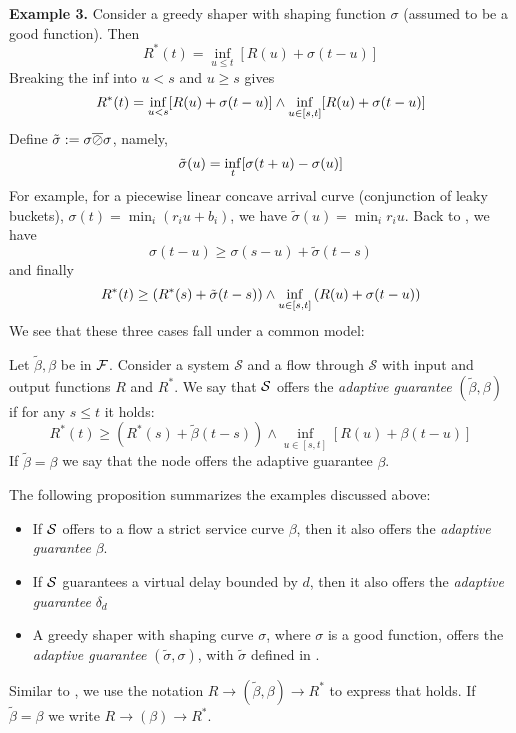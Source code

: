 \textbf{Example 3.} Consider a greedy shaper with shaping
function $\sigma$ (assumed to be a good function). Then
$$
R^*(t) = \inf_{u\leq t} [R(u) + \sigma(t-u)]
$$
Breaking the inf into $u <s$ and $u\geq s$ gives
\begin{equation}\mylabel{eq-ascsh1}
  R^*(t) = \inf_{u < s}[R(u)+\sigma(t-u)] \wedge \inf_{u \in
[s,t]}[R(u)+\sigma(t-u)]
\end{equation}
Define $\tilde{\sigma}:=\sigma \overline{\oslash} \sigma$, namely,
\begin{equation}\mylabel{eq-ascsigtil}
\tilde{\sigma}(u) = \inf_t [\sigma(t+u) - \sigma(u)]
\end{equation}
For example, for a piecewise linear concave arrival curve
(conjunction of leaky buckets), $\sigma(t)=\min_i (r_i u +
b_i)$, we have $\tilde{\sigma}(u)=\min_i r_i u$. Back to
, we have
$$
\sigma(t-u) \geq \sigma(s-u) + \tilde{\sigma}(t-s)
$$
and finally
\begin{equation}\mylabel{eq-introasc2}
 R^*(t) \geq \left( R^*(s) + \tilde{\sigma}(t-s)\right) \wedge \inf_{u \in
[s,t] }\left(R(u) + \sigma(t-u)\right)
\end{equation}
We see that these three cases fall under a common model:
\begin{definition}
Let $\tilde{\beta},\beta$ be in $\mathcal F$.
Consider a system $\mathcal{S}$ and a flow through
$\mathcal{S}$ with input and output functions $R$ and $R^{*}$.
We say that $\mathcal S$ offers the \emph{adaptive guarantee}
$(\tilde{\beta},\beta)$ if for any $s \leq t$ it holds:
$$
R^*(t) \geq \left( R^*(s) + \tilde{\beta}(t-s)\right)  \wedge
\inf_{u \in [s,t]}[R(u)+\beta(t-u)]
$$%
%
If $\tilde{\beta}=\beta$ we say that the node offers the
adaptive guarantee $\beta$.
\end{definition}
The following proposition summarizes the examples discussed
above:
\begin{proposition}
\begin{itemize}
  \item If $\mathcal S$ offers to a flow a strict service curve $\beta$, then
it also offers the \emph{adaptive guarantee} $\beta$.
  \item If $\mathcal S$ guarantees a virtual delay bounded by $d$, then
  it also offers the \emph{adaptive guarantee} $\delta_d$
  \item A greedy shaper with shaping curve $\sigma$, where
  $\sigma$ is a good function, offers the \emph{adaptive guarantee}
  $(\tilde{\sigma},\sigma)$,
with $\tilde{\sigma}$ defined in .
\end{itemize}
\end{proposition} Similar to \cite{oki98}, we use the notation $R
\rightarrow (\tilde{\beta}, \beta) \rightarrow R^*$ to express
that  holds. If $\tilde{\beta}=\beta$ we write
$R \rightarrow (\beta) \rightarrow R^*$.

